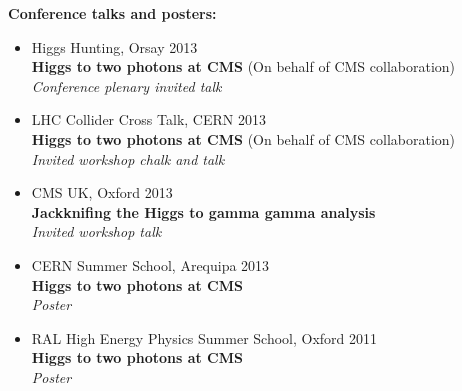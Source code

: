 \documentclass[11pt]{article}
\begin{document}
{\large \textbf{Conference talks and posters:}}

\begin{itemize}[leftmargin=2cm]

\item Higgs Hunting, Orsay 2013 \\
\textbf{Higgs to two photons at CMS} (On behalf of CMS collaboration) \\
\textit{Conference plenary invited talk}

\item LHC Collider Cross Talk, CERN 2013 \\
\textbf{Higgs to two photons at CMS} (On behalf of CMS collaboration) \\
\textit{Invited workshop chalk and talk}

\item CMS UK, Oxford 2013 \\
\textbf{Jackknifing the Higgs to gamma gamma analysis} \\
\textit{Invited workshop talk}

\item CERN Summer School, Arequipa 2013 \\
\textbf{Higgs to two photons at CMS} \\
\textit{Poster}

\item RAL High Energy Physics Summer School, Oxford 2011 \\
\textbf{Higgs to two photons at CMS} \\
\textit{Poster}

\end{itemize}
\end{document}

